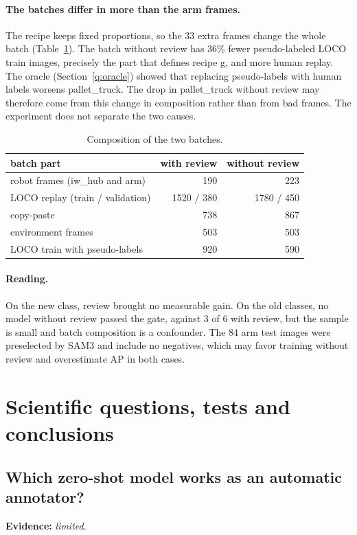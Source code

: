 \documentclass[11pt,a4paper]{article}
\newcommand{\evidence}[1]{\noindent\textbf{Evidence:} \emph{#1}.\par}
\begin{document}
\paragraph{The batches differ in more than the arm frames.} The recipe keeps fixed
proportions, so the 33 extra frames change the whole batch
(Table~\ref{tab:batches}). The batch without review has 36\% fewer pseudo-labeled
LOCO train images, precisely the part that defines recipe g, and more human
replay. The oracle (Section~\ref{q:oracle}) showed that replacing pseudo-labels
with human labels worsens pallet\_truck. The drop in pallet\_truck without review
may therefore come from this change in composition rather than from bad frames.
The experiment does not separate the two causes.

\begin{table}[H]
\centering\small
\caption{Composition of the two batches.}
\label{tab:batches}
\begin{tabular}{lrr}
\toprule
batch part & with review & without review \\
\midrule
robot frames (iw\_hub and arm) & 190 & 223 \\
LOCO replay (train / validation) & 1520 / 380 & 1780 / 450 \\
copy-paste & 738 & 867 \\
environment frames & 503 & 503 \\
LOCO train with pseudo-labels & 920 & 590 \\
\bottomrule
\end{tabular}
\end{table}

\paragraph{Reading.} On the new class, review brought no measurable gain. On the
old classes, no model without review passed the gate, against 3 of 6 with review,
but the sample is small and batch composition is a confounder. The 84 arm test
images were preselected by SAM3 and include no negatives, which may favor training
without review and overestimate AP in both cases.

\section{Scientific questions, tests and conclusions}
\label{sec:questions}

\subsection{Which zero-shot model works as an automatic annotator?}
\evidence{limited}
\end{document}
